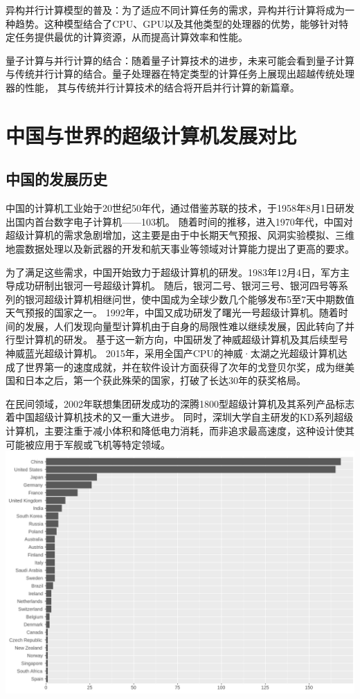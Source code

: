 \documentclass{ctexart}
\begin{document}
异构并行计算模型的普及：为了适应不同计算任务的需求，异构并行计算将成为一种趋势。这种模型结合了CPU、GPU以及其他类型的处理器的优势，能够针对特定任务提供最优的计算资源，从而提高计算效率和性能。

量子计算与并行计算的结合：随着量子计算技术的进步，未来可能会看到量子计算与传统并行计算的结合。量子处理器在特定类型的计算任务上展现出超越传统处理器的性能，
其与传统并行计算技术的结合将开启并行计算的新篇章。
\section{中国与世界的超级计算机发展对比}
\subsection{中国的发展历史}
中国的计算机工业始于20世纪50年代，通过借鉴苏联的技术，于1958年8月1日研发出国内首台数字电子计算机——103机。\cite{103Machine}
随着时间的推移，进入1970年代，中国对超级计算机的需求急剧增加，这主要是由于中长期天气预报、风洞实验模拟、三维地震数据处理以及新武器的开发和航天事业等领域对计算能力提出了更高的要求。

为了满足这些需求，中国开始致力于超级计算机的研发。1983年12月4日，军方主导成功研制出银河一号超级计算机。\cite{GalaxyToTianhe}
随后，银河二号、银河三号、银河四号等系列的银河超级计算机相继问世，使中国成为全球少数几个能够发布5至7天中期数值天气预报的国家之一。
1992年，中国又成功研发了曙光一号超级计算机。随着时间的发展，人们发现向量型计算机由于自身的局限性难以继续发展，因此转向了并行型计算机的研发。
基于这一新方向，中国研发了神威超级计算机及其后续型号神威蓝光超级计算机。\cite{ShenweiBluelight}
2015年，采用全国产CPU的神威·太湖之光超级计算机达成了世界第一的速度成就，并在软件设计方面获得了次年的戈登贝尔奖，成为继美国和日本之后，第一个获此殊荣的国家，打破了长达30年的获奖格局。\cite{SupercomputingAward}

在民间领域，2002年联想集团研发成功的深腾1800型超级计算机及其系列产品标志着中国超级计算机技术的又一重大进步。
同时，深圳大学自主研发的KD系列超级计算机，主要注重于减小体积和降低电力消耗，而非追求最高速度，这种设计使其可能被应用于军舰或飞机等特定领域。
\includegraphics[width=\linewidth]{top500_supercomputers_by_country.png}
\end{document}
